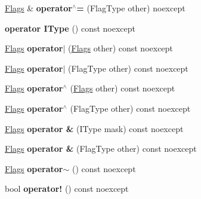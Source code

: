 \begin{Indent}
\begin{DoxyCompactItemize}
\mbox{\label{classrev_1_1_flags_a33bdb755a0ec217a9422ce95f7d01937}} 
\mbox{\hyperlink{classrev_1_1_flags}{Flags}} \& {\bfseries operator$^\wedge$=} (Flag\+Type other) noexcept
\item 
\mbox{\label{classrev_1_1_flags_a2c7d0a30b2ca08db2a6d0c45c4264fee}} 
{\bfseries operator I\+Type} () const noexcept
\item 
\mbox{\label{classrev_1_1_flags_a7871593e3bb96a67b660757843665ee3}} 
\mbox{\hyperlink{classrev_1_1_flags}{Flags}} {\bfseries operator$\vert$} (\mbox{\hyperlink{classrev_1_1_flags}{Flags}} other) const noexcept
\item 
\mbox{\label{classrev_1_1_flags_adc4003ec072d532fce485ca7fc317474}} 
\mbox{\hyperlink{classrev_1_1_flags}{Flags}} {\bfseries operator$\vert$} (Flag\+Type other) const noexcept
\item 
\mbox{\label{classrev_1_1_flags_a445ce2924ec1a45c10dea31abee9d3da}} 
\mbox{\hyperlink{classrev_1_1_flags}{Flags}} {\bfseries operator$^\wedge$} (\mbox{\hyperlink{classrev_1_1_flags}{Flags}} other) const noexcept
\item 
\mbox{\label{classrev_1_1_flags_ab5b442dcb2c9a09a133bf31ca19c78ec}} 
\mbox{\hyperlink{classrev_1_1_flags}{Flags}} {\bfseries operator$^\wedge$} (Flag\+Type other) const noexcept
\item 
\mbox{\label{classrev_1_1_flags_a8dd61258efef07e8bb1744487d1b40d4}} 
\mbox{\hyperlink{classrev_1_1_flags}{Flags}} {\bfseries operator \&} (I\+Type mask) const noexcept
\item 
\mbox{\label{classrev_1_1_flags_ac9d45c2a0d2cda59701d727eb5a2d1ac}} 
\mbox{\hyperlink{classrev_1_1_flags}{Flags}} {\bfseries operator \&} (Flag\+Type other) const noexcept
\item 
\mbox{\label{classrev_1_1_flags_a74f01d298e5d13e1e43cd222bfb4369e}} 
\mbox{\hyperlink{classrev_1_1_flags}{Flags}} {\bfseries operator$\sim$} () const noexcept
\item 
\mbox{\label{classrev_1_1_flags_adee82d94a9f5399787be3c80b6915a3e}} 
bool {\bfseries operator!} () const noexcept
\end{DoxyCompactItemize}
\end{Indent}
